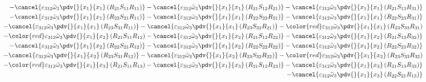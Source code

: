 \begin{equation}
	\begin{split}
		-\cancel{\varepsilon_{312}\tilde{\omega}_{3}\pdv{}{x_{1}}{x_{1}}\left(R_{21}S_{11}R_{11}\right)}
		-\cancel{\varepsilon_{312}\tilde{\omega}_{3}\pdv{}{x_{1}}{x_{1}}\left(R_{21}S_{12}R_{21}\right)}
		-\cancel{\varepsilon_{312}\tilde{\omega}_{3}\pdv{}{x_{1}}{x_{1}}\left(R_{21}S_{13}R_{31}\right)}\\
		-\cancel{\varepsilon_{312}\tilde{\omega}_{3}\pdv{}{x_{1}}{x_{1}}\left(R_{22}S_{21}R_{11}\right)}
		-\cancel{\varepsilon_{312}\tilde{\omega}_{3}\pdv{}{x_{1}}{x_{1}}\left(R_{22}S_{22}R_{21}\right)}
		-\cancel{\varepsilon_{312}\tilde{\omega}_{3}\pdv{}{x_{1}}{x_{1}}\left(R_{22}S_{23}R_{31}\right)}\\
		-\cancel{\varepsilon_{312}\tilde{\omega}_{3}\pdv{}{x_{1}}{x_{1}}\left(R_{23}S_{31}R_{11}\right)}
		-\cancel{\varepsilon_{312}\tilde{\omega}_{3}\pdv{}{x_{1}}{x_{1}}\left(R_{23}S_{32}R_{21}\right)}
		-{\color{red}\varepsilon_{312}\tilde{\omega}_{3}\pdv{}{x_{1}}{x_{1}}\left(R_{23}S_{33}R_{31}\right)}\\
		-{\color{red}\varepsilon_{312}\tilde{\omega}_{3}\pdv{}{x_{1}}{x_{2}}\left(R_{21}S_{11}R_{12}\right)}
		-\cancel{\varepsilon_{312}\tilde{\omega}_{3}\pdv{}{x_{1}}{x_{2}}\left(R_{21}S_{12}R_{22}\right)}
		-\cancel{\varepsilon_{312}\tilde{\omega}_{3}\pdv{}{x_{1}}{x_{2}}\left(R_{21}S_{13}R_{32}\right)}\\
		-\cancel{\varepsilon_{312}\tilde{\omega}_{3}\pdv{}{x_{1}}{x_{2}}\left(R_{22}S_{21}R_{12}\right)}
		-\cancel{\varepsilon_{312}\tilde{\omega}_{3}\pdv{}{x_{1}}{x_{2}}\left(R_{22}S_{22}R_{22}\right)}
		-\cancel{\varepsilon_{312}\tilde{\omega}_{3}\pdv{}{x_{1}}{x_{2}}\left(R_{22}S_{23}R_{32}\right)}\\
		-\cancel{\varepsilon_{312}\tilde{\omega}_{3}\pdv{}{x_{1}}{x_{2}}\left(R_{23}S_{31}R_{12}\right)}
		-\cancel{\varepsilon_{312}\tilde{\omega}_{3}\pdv{}{x_{1}}{x_{2}}\left(R_{23}S_{32}R_{22}\right)}
		-{\color{red}\varepsilon_{312}\tilde{\omega}_{3}\pdv{}{x_{1}}{x_{2}}\left(R_{23}S_{33}R_{32}\right)}\\
		-{\color{red}\varepsilon_{312}\tilde{\omega}_{3}\pdv{}{x_{1}}{x_{3}}\left(R_{21}S_{11}R_{13}\right)}
		-\cancel{\varepsilon_{312}\tilde{\omega}_{3}\pdv{}{x_{1}}{x_{3}}\left(R_{21}S_{12}R_{23}\right)}
		-\cancel{\varepsilon_{312}\tilde{\omega}_{3}\pdv{}{x_{1}}{x_{3}}\left(R_{21}S_{13}R_{33}\right)}\\
		-\cancel{\varepsilon_{312}\tilde{\omega}_{3}\pdv{}{x_{1}}{x_{3}}\left(R_{22}S_{21}R_{13}\right)}

\end{split}
\end{equation}
